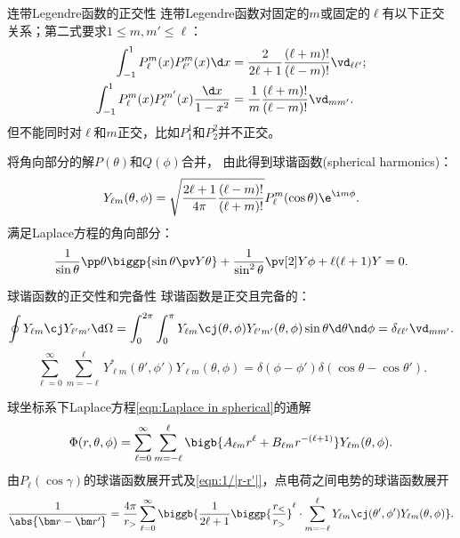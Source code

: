 \begin{theorem}
    {连带Legendre函数的正交性}{}
    连带Legendre函数对固定的$m$或固定的$\ell$有以下正交关系；第二式要求$1\leq m,m'\leq\ell$：
    \begin{subequations}
        \begin{align}
            \int_{-1}^1P_\ell^m(x)P_{\ell'}^m(x)\d x&=\frac2{2\ell+1}\frac{(\ell+m)!}{(\ell-m)!}\vd_{\ell\ell'};\\
            \int_{-1}^1P_\ell^m(x)P_\ell^{m'}(x)\frac{\d x}{1-x^2}&=\frac1m\frac{(\ell+m)!}{(\ell-m)!}\vd_{mm'}.
        \end{align}
    \end{subequations}
    但不能同时对$\ell$和$m$正交，比如$P_1^1$和$P_2^2$并不正交。
\end{theorem}
将角向部分的解$P(\theta)$和$Q(\phi)$合并，
由此得到球谐函数(spherical harmonics)：
\begin{equation}
    Y_{\ell m}(\theta,\phi)=\sqrt{\frac{2\ell+1}{4\pi}\frac{(\ell-m)!}{(\ell+m)!}}P_\ell^m(\cos\theta)\e^{\i m\phi}.
\end{equation}
满足Laplace方程的角向部分：
\[
    \frac1{\sin\theta}\pp\theta\biggp{\sin\theta\pv Y\theta}+\frac1{\sin^2\theta}\pv[2]Y\phi+\ell(\ell+1)Y=0.
\]
\begin{theorem}
    {球谐函数的正交性和完备性}{}
    球谐函数是正交且完备的：
    \[
        \oint Y_{\ell m}\cj Y_{\ell'm'}\d\Omega=\int_0^{2\pi}\int_0^\pi Y_{\ell m}\cj(\theta,\phi) Y_{\ell'm'}(\theta,\phi)\sin\theta\d\theta\nd\phi=\delta_{\ell\ell'}\vd_{mm'}.
    \]
    \begin{equation}
        \sum_{\ell=0}^\infty\sum_{m=-\ell}^\ell Y_{\ell m}^*(\theta',\phi')Y_{\ell m}(\theta,\phi)=\delta(\phi-\phi')\delta(\cos\theta-\cos\theta').
    \end{equation}
\end{theorem}

球坐标系下Laplace方程\eqref{eqn:Laplace in spherical}的通解
\begin{equation}
    \Phi(r,\theta,\phi)=\sum_{\ell=0}^\infty\sum_{m=-\ell}^\ell\bigb{A_{\ell m}r^\ell+B_{\ell m}r^{-(\ell+1)}}Y_{\ell m}(\theta,\phi).
\end{equation}
由$P_\ell(\cos\gamma)$的球谐函数展开式及\eqref{eqn:1/|r-r'|}，点电荷之间电势的球谐函数展开
\begin{equation}
    \label{eqn:1/|r-r'|=YY}
    \frac1{\abs{\bm r-\bm r'}}=\frac{4\pi}{r_>}\sum_{\ell=0}^\infty\biggb{\frac1{2\ell+1}\biggp{\frac{r_<}{r_>}}^\ell\cdot\sum_{m=-\ell}^\ell Y_{\ell m}\cj(\theta',\phi')Y_{\ell m}(\theta,\phi)}.
\end{equation}

